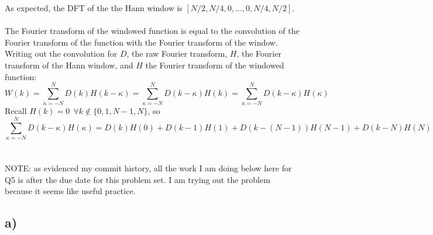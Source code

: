 \documentclass{article}
\newcommand{\<}[1]{\left\langle #1 \right\rangle }
\begin{document}
As expected, the DFT of the the Hann window is $[N/2, N/4, 0, ..., 0, N/4, N/2]$.\\
\\
The Fourier transform of the windowed function is equal to the convolution of the Fourier transform of the function with the Fourier transform of the window. Writing out the convolution for $D$, the raw Fourier transform, $H$, the Fourier transform of the Hann window, and $H$ the Fourier transform of the windowed function:
\[W(k) = \sum_{\kappa=-N}^N D(k)H(k - \kappa) = \sum_{\kappa=-N}^N D(k-\kappa)H(k) = \sum_{\kappa=-N}^N D(k-\kappa)H(\kappa)\]
Recall $H(k) = 0 \ \ \forall k \notin \{0, 1, N-1, N\}$, so
\[\sum_{\kappa=-N}^N D(k-\kappa)H(\kappa) = D(k)H(0) + D(k-1)H(1) + D(k-(N-1))H(N-1) + D(k-N)H(N) \]


\section{}
NOTE: as evidenced  my commit history, all the work I am doing below here for Q5 is after the due date for this problem set. I am trying out the problem because it seems like useful practice. 

\subsection{a)}




	
\end{document}
